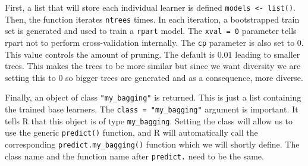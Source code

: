 \documentclass[
  11pt,
]{krantz}
\begin{document}
First, a list that will store each individual learner is defined \texttt{models\ \textless{}-\ list()}. Then, the function iterates \texttt{ntrees} times. In each iteration, a bootstrapped train set is generated and used to train a \texttt{rpart} model. The \texttt{xval\ =\ 0} parameter tells rpart not to perform cross-validation internally. The \texttt{cp} parameter is also set to \(0\). This value controls the amount of pruning. The default is \(0.01\) leading to smaller trees. This makes the trees to be more similar but since we want diversity we are setting this to \(0\) so bigger trees are generated and as a consequence, more diverse.

Finally, an object of class \texttt{"my\_bagging"} is returned. This is just a list containing the trained base learners. The \texttt{class\ =\ "my\_bagging"} argument is important. It tells R that this object is of type \texttt{my\_bagging}. Setting the class will allow us to use the generic \texttt{predict()} function, and R will automatically call the corresponding \texttt{predict.my\_bagging()} function which we will shortly define. The class name and the function name after \texttt{predict.} need to be the same.
\end{document}
